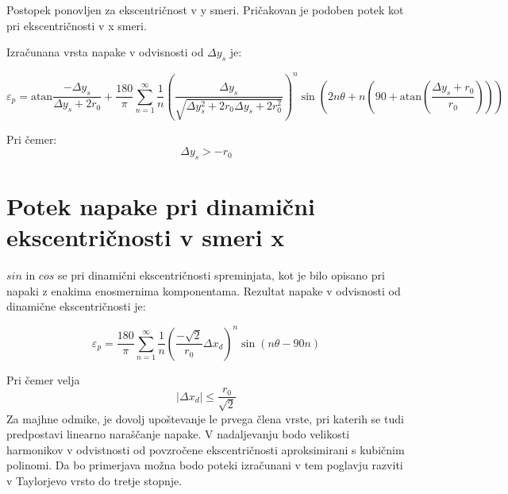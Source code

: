 Postopek ponovljen za  ekscentričnost v y smeri. Pričakovan je podoben potek kot pri ekscentričnosti v x smeri.
 
Izračunana vrsta napake v odvisnosti od  $\Delta y_s$ je:
 
  \begin{equation}
   \label{vrsta:ys}
 \varepsilon_p = \mathrm{atan}\frac{-\Delta y _s}{\Delta y _s+2r_0}+\frac{180}{\pi} \sum_{n=1}^{\infty}\frac{1}{n} (\frac{\Delta y _s}{\sqrt{\Delta y _s^2+2 r_0 \Delta y _s+2r_0^2}})^n \sin (2n \theta+n (90+ \mathrm{ atan}(\frac{\Delta y _s+r_0}{r_0})))
 \end{equation}

 Pri čemer:
$$\Delta y_s > -r_0$$

\section{Potek napake pri dinamični ekscentričnosti v smeri x}

$sin$ in $cos$ se pri dinamični ekscentričnosti spreminjata, kot je bilo opisano pri napaki z enakima enosmernima komponentama. Rezultat napake v odvisnosti od dinamične ekscentričnosti je:


%
%
%
\begin{equation}
\label{vrsta_xd}
\varepsilon_p=
\frac{180}{\pi}\sum_{n=1}^{\infty}\frac{1}{n}( \frac{-\sqrt{2}}{r_0}\Delta x_d)^n \sin (n \theta -  90 n)
\end{equation}

Pri čemer velja
$$|\Delta x_d|\leq \frac{r_0}{\sqrt{2}}$$
%
%
Za majhne odmike, je dovolj upoštevanje le prvega člena vrste, pri katerih se tudi predpostavi linearno naraščanje napake. V nadaljevanju bodo velikosti harmonikov v odvistnosti od povzročene ekscentričnosti aproksimirani s kubičnim polinomi. Da bo primerjava možna bodo poteki izračunani v tem poglavju razviti v Taylorjevo vrsto do tretje stopnje.
% 









